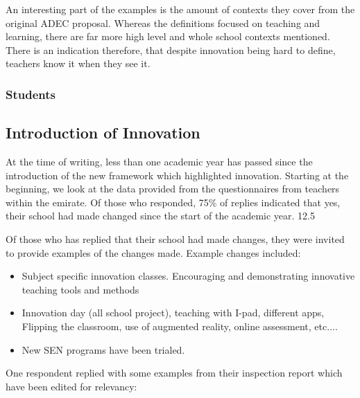 An interesting part of the examples is the amount of contexts they cover from the original ADEC proposal. Whereas the definitions focused on teaching and learning, there are far more high level and whole school contexts mentioned. There is an indication therefore, that despite innovation being hard to define, teachers know it when they see it.

\subsubsection{Students}

\subsection{Introduction of Innovation}
At the time of writing, less than one academic year has passed since the introduction of the new framework which highlighted innovation. Starting at the beginning, we look at the data provided from the questionnaires from teachers within the emirate. Of those who responded, 75\% of replies indicated that yes, their school had made changed since the start of the academic year. 12.5%

Of those who has replied that their school had made changes, they were invited to provide examples of the changes made. Example changes included:

\begin{itemize}
\item Subject specific innovation classes. Encouraging and demonstrating innovative teaching tools and methods
\item Innovation day (all school project), teaching with I-pad, different apps, Flipping the classroom, use of augmented reality, online assessment, etc....
\item New SEN programs have been trialed.
\end{itemize}

One respondent replied with some examples from their inspection report which have been edited for relevancy:

